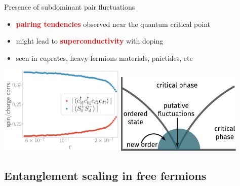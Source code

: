 \documentclass[11pt,aspectratio=169]{beamer}
\newcommand{\focus}[1]{\textcolor{red}{\bf{#1}}}
\begin{document}
\begin{frame}{Presence of subdominant pair fluctuations}
	
\begin{itemize}
	\item \focus{pairing tendencies} observed near the quantum critical point\\[10pt]
	\item might lead to \focus{superconductivity} with doping\\[10pt]
	\item seen in cuprates, heavy-fermions materials, pnictides, etc\\[10pt]
\end{itemize}
\includegraphics[width=0.45\textwidth]{odlro_d0.pdf}
\hspace*{\fill}
\includegraphics[width=0.45\textwidth]{gen-phase-diagram.pdf}
\end{frame}



\begin{frame}{}
\section{Entanglement scaling in free fermions}
\end{frame}
\end{document}
